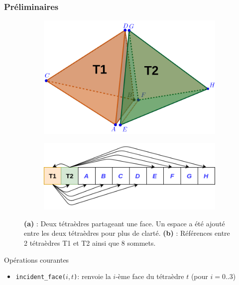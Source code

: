 \documentclass[9pt]{beamer}
\begin{document}
\begin{frame}
\footnotesize
\frametitle{Préliminaires}
\begin{figure}[H]
\centering
\begin{subfigure}{.5\textwidth}
  \centering
  \includegraphics[scale=0.07]{../Images/lala}
  \caption{}
\end{subfigure}%
\begin{subfigure}{.5\textwidth}
  \centering
  \includegraphics[scale=0.14]{../Images/Untitled_Diagram}
  \caption{}
\end{subfigure}
\vspace{-4.5pt}
\caption{\textbf{(a)} : Deux tétraèdres partageant une face. Un espace a été ajouté entre les deux tétraèdres pour plus de clarté. \textbf{(b)} : Références entre 2 tétraèdres T1 et T2 ainsi que 8 sommets.}
\end{figure}
\vspace{-5.5pt}
\begin{block}{Opérations courantes}
\begin{itemize}
\item \texttt{incident\_face($i,t$)}: renvoie la $i$-ème face du tétraèdre $t$ (pour $i=0..3$)

\end{itemize}
\end{block}
\end{frame}
\end{document}
